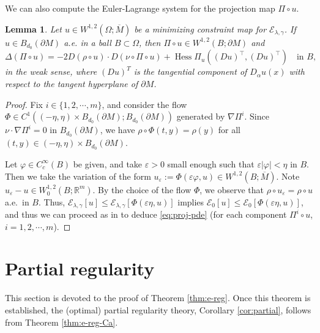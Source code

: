\documentclass[11pt]{amsart}
\newcommand{\R}{{\mathbb R}}
\newcommand{\cE}{{\mathcal E}}
\newcommand{\e}{\varepsilon}
\newcommand{\vp}{\varphi}
\newcommand{\Hess}{\operatorname{Hess}}
\theoremstyle{plain}
\newtheorem{lem}[thm]{Lemma}
\theoremstyle{definition}
\theoremstyle{remark}
\numberwithin{equation}{section}
\begin{document}
We can also compute the Euler-Lagrange system for the projection map $\Pi\circ u$.

\begin{lem}\label{lem:proj-pde}
    Let $u\in W^{1,2}(\Omega;\overline M)$ be a minimizing constraint map for $\cE_{\lambda,\gamma}$. If $u\in {B_{d_0}(\partial M)}$ a.e.  in a ball    $B\subset\Omega$, then $\Pi\circ u\in W^{1,2}(B;\partial M)$ and 
    \begin{equation}\label{eq:proj-pde}
    \Delta(\Pi\circ u) = -2 D(\rho\circ u)\cdot D(\nu\circ\Pi\circ u) + \Hess\Pi_u((Du)^\top,(Du)^\top)\quad\text{in } B,
    \end{equation}
    in the weak sense, where $(Du)^T$ is the tangential component of $D_\alpha u(x)$ with respect to the tangent hyperplane of $\partial M$.
\end{lem}

\begin{proof}
Fix $i\in\{1,2,\cdots,m\}$, and consider the flow $\Phi \in C^1((-\eta,\eta) \times {B_{d_0}(\partial M)}; {B_{d_0}(\partial M)})$ generated by $\nabla \Pi^i$. Since $\nu\cdot\nabla\Pi^i = 0$ in ${B_{d_0}(\partial M)}$, we have $\rho\circ \Phi(t,y) = \rho(y)$ for all $(t,y)\in(-\eta,\eta)\times {B_{d_0}(\partial M)}$. 

Let 
$\vp\in C_c^\infty(B)$ be given, and take $\e> 0$ small enough such that $\e|\vp| < \eta$ in $B$. Then we take the variation of the form $u_\e := \Phi(\e\vp, u)\in W^{1,2}(B;\overline M)$. Note $u_\e - u \in W_0^{1,2}(B;\R^m)$. By the choice of the flow $\Phi$, we observe that $\rho\circ u_\e = \rho\circ u$ a.e.\ in $B$. Thus, $\cE_{\lambda,\gamma}[u]\leq \cE_{\lambda,\gamma}[\Phi(\e\eta,u)]$ implies $\cE_0[u] \leq \cE_0[\Phi(\e\eta,u)]$, and thus we can proceed as in \cite[Corollary 3.6]{FGKS1} to deduce \eqref{eq:proj-pde} (for each component $\Pi^i\circ u$, $i = 1,2,\cdots,m$). 
\end{proof}



\section{Partial regularity}\label{sec:part-reg}



This section is devoted to the proof of Theorem \ref{thm:e-reg}. Once this theorem is established, the (optimal) partial regularity theory, Corollary \ref{cor:partial}, follows from Theorem \ref{thm:e-reg-Ca}. 
\end{document}
